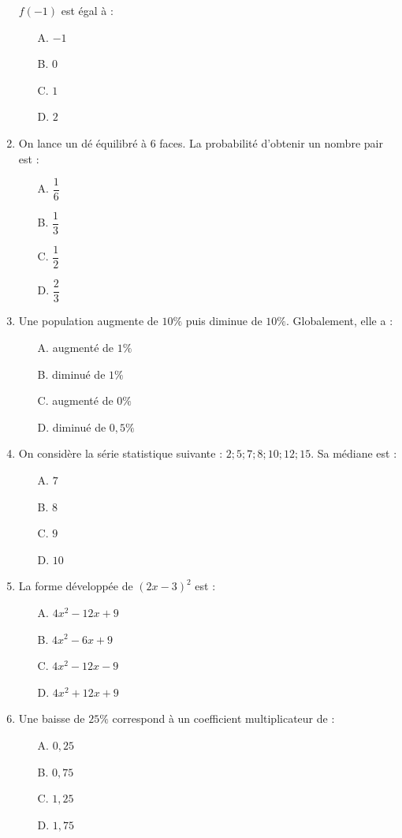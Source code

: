 \documentclass[a4paper,12pt]{article}
\begin{document}
\begin{enumerate}
$f(-1)$ est égal à :
\begin{itemize}
\item[A.] $-1$
\item[B.] $0$
\item[C.] $1$
\item[D.] $2$
\end{itemize}

\item On lance un dé équilibré à 6 faces. La probabilité d'obtenir un nombre pair est :
\begin{itemize}
\item[A.] $\dfrac{1}{6}$
\item[B.] $\dfrac{1}{3}$
\item[C.] $\dfrac{1}{2}$
\item[D.] $\dfrac{2}{3}$
\end{itemize}

\item Une population augmente de $10\%$ puis diminue de $10\%$. Globalement, elle a :
\begin{itemize}
\item[A.] augmenté de $1\%$
\item[B.] diminué de $1\%$
\item[C.] augmenté de $0\%$
\item[D.] diminué de $0,5\%$
\end{itemize}

\item On considère la série statistique suivante : $2; 5; 7; 8; 10; 12; 15$. Sa médiane est :
\begin{itemize}
\item[A.] $7$
\item[B.] $8$
\item[C.] $9$
\item[D.] $10$
\end{itemize}

\item La forme développée de $(2x - 3)^2$ est :
\begin{itemize}
\item[A.] $4x^2 - 12x + 9$
\item[B.] $4x^2 - 6x + 9$
\item[C.] $4x^2 - 12x - 9$
\item[D.] $4x^2 + 12x + 9$
\end{itemize}

\item Une baisse de $25\%$ correspond à un coefficient multiplicateur de :
\begin{itemize}
\item[A.] $0,25$
\item[B.] $0,75$
\item[C.] $1,25$
\item[D.] $1,75$
\end{itemize}


\end{enumerate}
\end{document}
